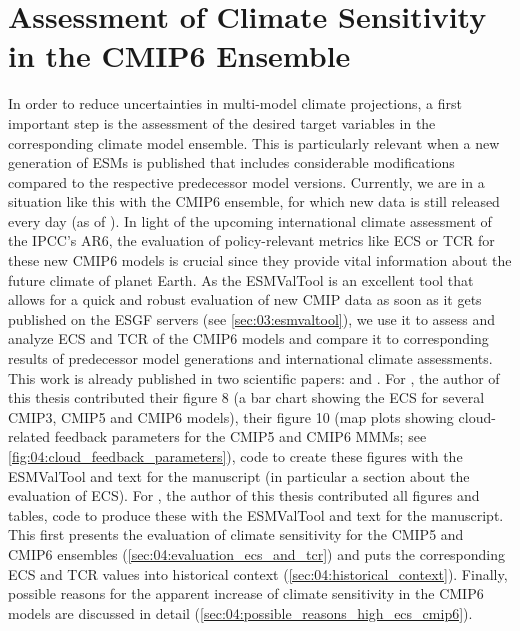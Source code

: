 


\chapter{Assessment of Climate Sensitivity in the \acs{CMIP}6 Ensemble}
\label{ch:04:papers_ecs_tcr_assessment}

In order to reduce uncertainties in multi-model climate projections, a first
important step is the assessment of the desired target variables in the
corresponding climate model ensemble. This is particularly relevant when a new
generation of \acp{ESM} is published that includes considerable modifications
compared to the respective predecessor model versions. Currently, we are in a
situation like this with the \acs{CMIP}6 ensemble, for which new data is still
released every day (as of \TheMonth{}). In light of the upcoming international
climate assessment of the \ac{IPCC}'s \acs{AR}6, the evaluation of
policy-relevant metrics like \ac{ECS} or \ac{TCR} for these new \acs{CMIP}6
models is crucial since they provide vital information about the future climate
of planet Earth. As the \ac{ESMValTool} is an excellent tool that allows for a
quick and robust evaluation of new \ac{CMIP} data as soon as it gets published
on the \ac{ESGF} servers (see \cref{sec:03:esmvaltool}), we use it to assess
and analyze \ac{ECS} and \ac{TCR} of the \acs{CMIP}6 models and compare it to
corresponding results of predecessor model generations and international
climate assessments. This work is already published in two scientific papers:
\textcite{Bock2020} and \textcite{Meehl2020}. For \textcite{Bock2020}, the
author of this thesis contributed their figure 8 (a bar chart showing the
\ac{ECS} for several \acs{CMIP}3, \acs{CMIP}5 and \acs{CMIP}6 models), their
figure 10 (map plots showing cloud-related feedback parameters for the
\acs{CMIP}5 and \acs{CMIP}6 \acp{MMM}; see
\cref{fig:04:cloud_feedback_parameters}), code to create these figures with the
\ac{ESMValTool} and text for the manuscript (in particular a section about the
evaluation of \ac{ECS}). For \textcite{Meehl2020}, the author of this thesis
contributed all figures and tables, code to produce these with the
\ac{ESMValTool} and text for the manuscript. This
 first presents the evaluation of
climate sensitivity for the \acs{CMIP}5 and \acs{CMIP}6 ensembles
(\cref{sec:04:evaluation_ecs_and_tcr}) and puts the corresponding \ac{ECS} and
\ac{TCR} values into historical context (\cref{sec:04:historical_context}).
Finally, possible reasons for the apparent increase of climate sensitivity in
the \acs{CMIP}6 models are discussed in detail
(\cref{sec:04:possible_reasons_high_ecs_cmip6}).


